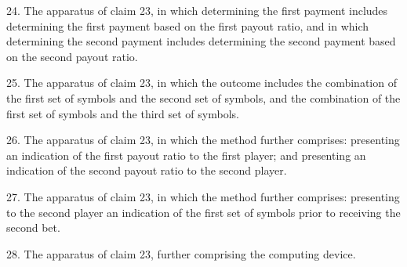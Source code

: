 \documentclass[11pt,a4paper]{article}
\begin{document}
24. The apparatus of claim 23, in which determining the first payment includes determining the first payment based on the first payout ratio, and in which determining the second payment includes determining the second payment based on the second payout ratio.

25. The apparatus of claim 23, in which the outcome includes the combination of the first set of symbols and the second set of symbols, and the combination of the first set of symbols and the third set of symbols.

26. The apparatus of claim 23, in which the method further comprises: presenting an indication of the first payout ratio to the first player; and presenting an indication of the second payout ratio to the second player.

27. The apparatus of claim 23, in which the method further comprises: presenting to the second player an indication of the first set of symbols prior to receiving the second bet.

28. The apparatus of claim 23, further comprising the computing device.
\end{document}

